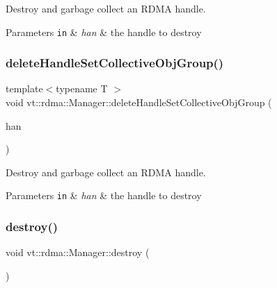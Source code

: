 Destroy and garbage collect an R\+D\+MA handle. 


\begin{DoxyParams}[1]{Parameters}
\mbox{\tt in}  & {\em han} & the handle to destroy \\
\hline
\end{DoxyParams}
\mbox{\label{structvt_1_1rdma_1_1_manager_a9b3b9bf148a8225295879481345e4af3}} 
\subsubsection{\texorpdfstring{delete\+Handle\+Set\+Collective\+Obj\+Group()}{deleteHandleSetCollectiveObjGroup()}}
{\footnotesize\ttfamily template$<$typename T $>$ \\
void vt\+::rdma\+::\+Manager\+::delete\+Handle\+Set\+Collective\+Obj\+Group (\begin{DoxyParamCaption}\item[{\hyperlink{structvt_1_1rdma_1_1_handle_set}{Handle\+Set}$<$ T $>$ \&}]{han }\end{DoxyParamCaption})}



Destroy and garbage collect an R\+D\+MA handle. 


\begin{DoxyParams}[1]{Parameters}
\mbox{\tt in}  & {\em han} & the handle to destroy \\
\hline
\end{DoxyParams}
\mbox{\label{structvt_1_1rdma_1_1_manager_a16d6d19d7a0eb1dfac611702832617a7}} 
\subsubsection{\texorpdfstring{destroy()}{destroy()}}
{\footnotesize\ttfamily void vt\+::rdma\+::\+Manager\+::destroy (\begin{DoxyParamCaption}{ }\end{DoxyParamCaption})}



